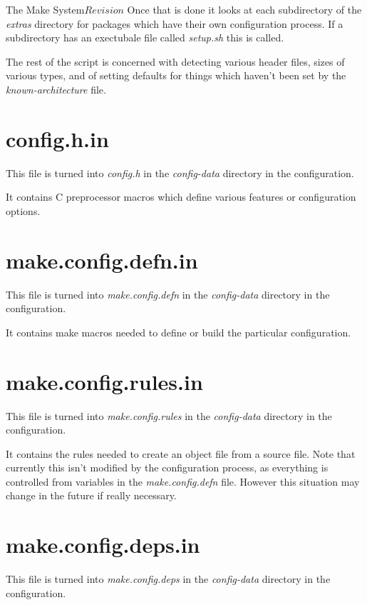 \begin{cactuspart}{3}{The Make System}{}{$Revision$}
Once that is done it looks at each subdirectory of the {\em extras}
directory for packages which have their own configuration process.  If a
subdirectory has an exectubale file called {\em setup.sh} this is called.

The rest of the script is concerned with detecting various header files,
sizes of various types, and of setting defaults for things which haven't
been set by the {\em known-architecture} file.

\section{config.h.in}
\label{sec:autoconf:h}

This file is turned into {\em config.h} in the {\em config-data}
directory in the configuration.

It contains C preprocessor macros which define various features or
configuration options.

\section{make.config.defn.in}
\label{sec:autoconf:defn}

This file is turned into {\em make.config.defn} in the {\em config-data}
directory in the configuration.

It contains make macros needed to define or build the particular 
configuration.

\section{make.config.rules.in}
\label{sec:autoconf:rules}

This file is turned into {\em make.config.rules} in the {\em config-data}
directory in the configuration.

It contains the rules needed to create an object file from a source file.
Note that currently this isn't modified by the configuration process, as
everything is controlled from variables in the {\em make.config.defn} file.
However this situation may change in the future if really necessary.

\section{make.config.deps.in}
\label{sec:autoconf:deps}

This file is turned into {\em make.config.deps} in the {\em config-data}
directory in the configuration.


\end{cactuspart}
